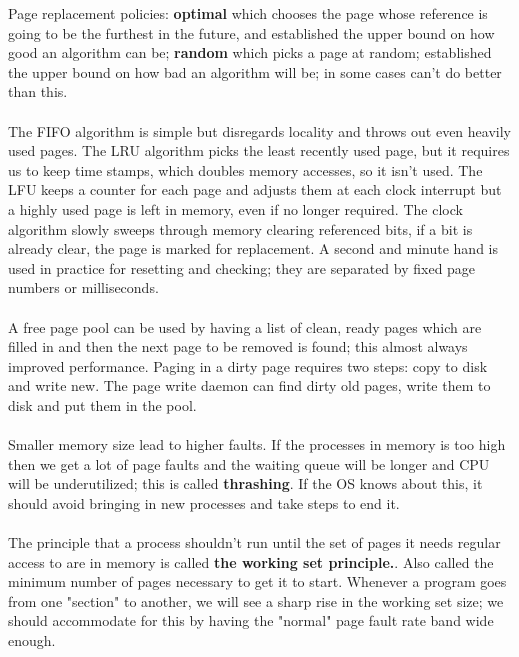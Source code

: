 \documentclass[twoside]{article}
\begin{document}
Page replacement policies: \textbf{optimal} which chooses the page whose reference is going to be the furthest in the future, and established the upper bound on how good an algorithm can be; \textbf{random} which picks a page at random; established the upper bound on how bad an algorithm will be; in some cases can't do better than this.\\ \\
The FIFO algorithm is simple but disregards locality and throws out even heavily used pages. The LRU algorithm picks the least recently used page, but it requires us to keep time stamps, which doubles memory accesses, so it isn't used. The LFU keeps a counter for each page and adjusts them at each clock interrupt but a highly used page is left in memory, even if no longer required. The clock algorithm slowly sweeps through memory clearing referenced bits, if a bit is already clear, the page is marked for replacement. A second and minute hand is used in practice for resetting and checking; they are separated by fixed page numbers or milliseconds.\\ \\
A free page pool can be used by having a list of clean, ready pages which are filled in and then the next page to be removed is found; this almost always improved performance. Paging in a dirty page requires two steps: copy to disk and write new. The page write daemon can find dirty old pages, write them to disk and put them in the pool.\\ \\
Smaller memory size lead to higher faults. If the processes in memory is too high then we get a lot of page faults and the waiting queue will be longer and CPU will be underutilized; this is called \textbf{thrashing}. If the OS knows about this, it should avoid bringing in new processes and take steps to end it.\\ \\
The principle that a process shouldn't run until the set of pages it needs regular access to are in memory is called \textbf{the working set principle.}. Also called the minimum number of pages necessary to get it to start. Whenever a program goes from one "section" to another, we will see a sharp rise in the working set size; we should accommodate for this by having the "normal" page fault rate band wide enough.\\ \\
\end{document}
